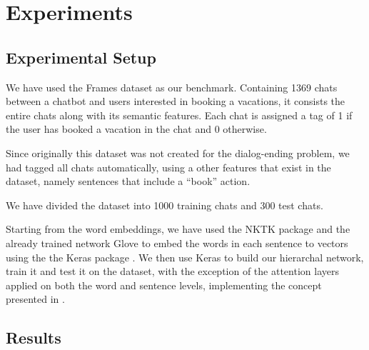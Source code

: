 \section{Experiments}\label{sec:exp}

\subsection{Experimental Setup}
We have used the Frames dataset \cite{frames} as 
our benchmark. Containing 1369 chats between 
a chatbot and users interested in booking a vacations, 
it consists the entire chats along with its semantic features. 
Each chat is assigned a tag of 1 if the user has booked a vacation 
in the chat and 0 otherwise. 

Since originally this dataset was not created for the dialog-ending problem, 
we had tagged all chats automatically, using a other features that exist 
in the dataset, namely sentences that include a ``book'' action. 

We have divided the dataset into 1000 training chats and 300 test chats.

Starting from the word embeddings, we have used the 
NKTK package \cite{DBLP:conf/acl/Bird06} and the already trained network Glove \cite{DBLP:conf/emnlp/PenningtonSM14} 
to embed the words in each sentence to vectors using the the Keras package \cite{chollet2015}. 
We then use Keras to build our hierarchal network, train it and test it on the 
dataset, with the exception of the attention layers applied on both the word and sentence 
levels, implementing the concept presented in \cite{DBLP:conf/naacl/YangYDHSH16,tc}.



\subsection{Results}
